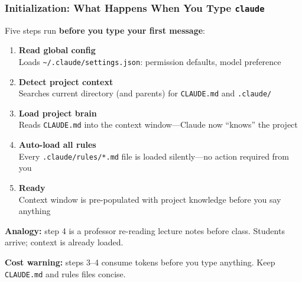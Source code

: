 \documentclass[10pt,english,aspectratio=169]{beamer}
\begin{document}
\begin{frame}
\frametitle{Initialization: What Happens When You Type \texttt{claude}}

Five steps run \textbf{before you type your first message}:

\vspace{0.2cm}

\begin{enumerate}
    \item \textbf{Read global config} \\
    Loads \texttt{\textasciitilde/.claude/settings.json}: permission defaults, model preference

    \vspace{0.1cm}

    \item \textbf{Detect project context} \\
    Searches current directory (and parents) for \texttt{CLAUDE.md} and \texttt{.claude/}

    \vspace{0.1cm}

    \item \textbf{Load project brain} \\
    Reads \texttt{CLAUDE.md} into the context window---Claude now ``knows'' the project

    \vspace{0.1cm}

    \item \textbf{Auto-load all rules} \\
    Every \texttt{.claude/rules/*.md} file is loaded silently---no action required from you

    \vspace{0.1cm}

    \item \textbf{Ready} \\
    Context window is pre-populated with project knowledge before you say anything
\end{enumerate}

\vspace{0.25cm}

\textbf{Analogy:} step 4 is a professor re-reading lecture notes before class. Students arrive; context is already loaded.

\vspace{0.1cm}

\textbf{Cost warning:} steps 3--4 consume tokens before you type anything. Keep \texttt{CLAUDE.md} and rules files concise.
\end{frame}
\end{document}
